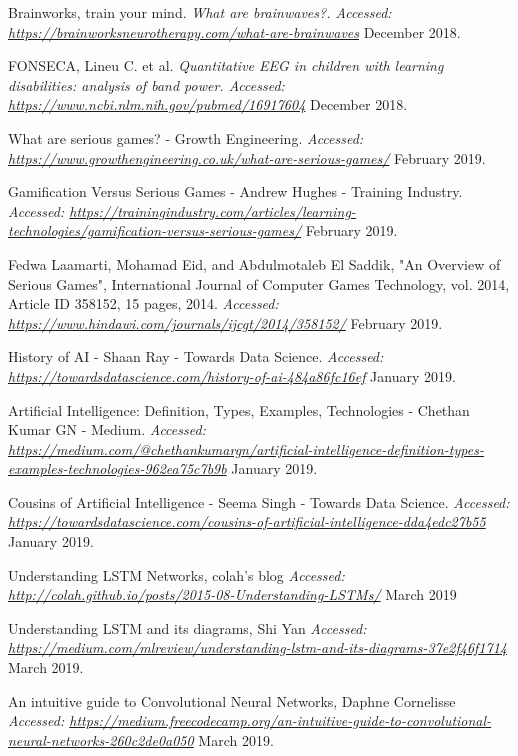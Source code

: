 \begin{thebibliography}{1}
 Brainworks, train your mind. {\em What are brainwaves?. Accessed: \url{https://brainworksneurotherapy.com/what-are-brainwaves}} December 2018.

 FONSECA, Lineu C. et al. {\em Quantitative EEG in children with learning disabilities: analysis of band power. Accessed:  \url{https://www.ncbi.nlm.nih.gov/pubmed/16917604}} December 2018.

 What are serious games? - Growth Engineering. {\em Accessed: \url{https://www.growthengineering.co.uk/what-are-serious-games/}} February 2019.

 Gamification Versus Serious Games - Andrew Hughes - Training Industry. {\em Accessed: \url{https://trainingindustry.com/articles/learning-technologies/gamification-versus-serious-games/}} February 2019.

 Fedwa Laamarti, Mohamad Eid, and Abdulmotaleb El Saddik, "An Overview of Serious Games", International Journal of Computer Games Technology, vol. 2014, Article ID 358152, 15 pages, 2014.  {\em Accessed: \url{https://www.hindawi.com/journals/ijcgt/2014/358152/}} February 2019.

 History of AI - Shaan Ray - Towards Data Science.  {\em Accessed:  \url{https://towardsdatascience.com/history-of-ai-484a86fc16ef}} January 2019.

 Artificial Intelligence: Definition, Types, Examples, Technologies - Chethan Kumar GN - Medium. {\em Accessed: \url{https://medium.com/@chethankumargn/artificial-intelligence-definition-types-examples-technologies-962ea75c7b9b}} January 2019.

 Cousins of Artificial Intelligence - Seema Singh - Towards Data Science. {\em Accessed: \url{https://towardsdatascience.com/cousins-of-artificial-intelligence-dda4edc27b55}} January 2019.

 Understanding LSTM Networks, colah's blog {\em Accessed:  \url{http://colah.github.io/posts/2015-08-Understanding-LSTMs/}} March 2019

 Understanding LSTM and its diagrams, Shi Yan {\em Accessed:  \url{https://medium.com/mlreview/understanding-lstm-and-its-diagrams-37e2f46f1714}} March 2019.

 An intuitive guide to Convolutional Neural Networks, Daphne Cornelisse {\em Accessed:  \url{https://medium.freecodecamp.org/an-intuitive-guide-to-convolutional-neural-networks-260c2de0a050}} March 2019.


\end{thebibliography}
